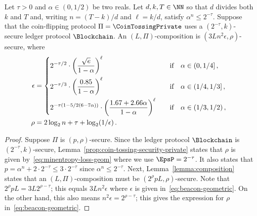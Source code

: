\begin{corollary}\label{coro:beacon-geometric}
    Let $\tau > 0$ and $\alpha \in (0, 1/2)$ be two reals. 
    Let $d, k, T \in \NN$ 
    so that $d$ divides both $k$ and $T$ and, 
    writing $n = (T - k)/d$ and $\ell = k/d$, 
    satisfy $\alpha^n \leq 2^{-\tau}$.
    Suppose that the coin-flipping protocol $\Pi = \CoinTossingPrivate$ 
    uses a $(2^{-\tau}, k)$-secure ledger protocol $\Blockchain$.
    An $(L, \Pi)$-composition is 
    $\left(3 L n^2 \epsilon, \rho\right)$-secure, where 
  \begin{align}
    \label{eq:beacon-geometric}
    \epsilon &= 
    \begin{dcases}            
        2^{-\tau/2}\cdot 
            \left( \frac{\sqrt{e}}{1 - \alpha} \right)^\ell 
            &\quad\text{if}\quad\alpha \in (0, 1/4]\,, \\
        2^{-\tau/3}\cdot 
            \left( \frac{0.85}{1-\alpha} \right)^\ell
            &\quad\text{if}\quad\alpha \in (1/4, 1/3]\,, \\
        2^{-\tau(1 - 5/2(6 - 7\alpha) )} \cdot 
            \left( \frac{1.67 + 2.66 \alpha}{1-\alpha} \right)^\ell
            &\quad\text{if}\quad\alpha \in (1/3, 1/2)\,,
    \end{dcases}
    \\
        \rho &= 2 \log_2 n + \tau + \log_2(1/\epsilon)
        \,.
  \end{align}  
\end{corollary}
\begin{proof}
    Suppose $\Pi$ is $(p, \rho)$-secure. 
    Since the ledger protocol $\Blockchain$ is $(2^{-\tau}, k)$-secure, 
    Lemma~\ref{prop:coin-tossing-security-private} states that 
    $\rho$ is given by~\eqref{eq:minentropy-loss-geom} 
    where we use $\EpsP = 2^{-\tau}$. 
    It also states that 
    $p = \alpha^n + 2 \cdot 2^{-\tau} \leq 3 \cdot 2^{-\tau}$ 
    since $\alpha^n \leq 2^{-\tau}$. 
    Next, Lemma~\ref{lemma:composition} states that 
    an $(L, \Pi)$-composition must be $(2^\rho p L, \rho)$-secure.
    Note that $2^\rho p L = 3 L 2^{\rho - \tau}$; 
    this equals $3 L n^2 \epsilon$ where $\epsilon$ is given in~\eqref{eq:beacon-geometric}. 
    On the other hand, this also means 
    $n^2 \epsilon = 2^{\rho - \tau}$; 
    this gives the expression for $\rho$ in~\eqref{eq:beacon-geometric}.
\end{proof}



